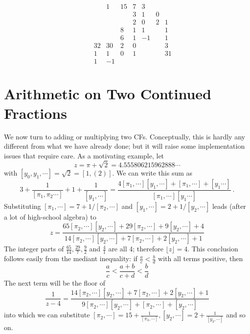 \documentclass[11pt, oneside]{amsart}   	%
\renewcommand{\:}{\negthickspace:\negthickspace}
\begin{document}
\begin{equation*}\label{eq:2dgrid}
\begin{matrix}
 & & & 1& 15&       7&  3& &\\
 & & &  &        &     3&   1& 0&\\
 & & &  &        &     2&    0& 2& 1\\
 & & &  &        8&   1&    1&   &  1\\
 & & &  &        6&   1&    -1&  & 1\\
 & & 32& 30&  2& 0&        &  &  3\\
 & &  1&   1&  0&  1&        &  & 31\\
 & &   1&  -1&   &    &        &  &
\end{matrix}
\end{equation*}


\section{Arithmetic on Two Continued Fractions}
We now turn to adding or multiplying two CFs. Conceptually, this is hardly any different from what we have already done;
but it will raise some implementation issues that require care. As a motivating example, let
\[
z = \pi + \sqrt{2} = 4.555806215962888\cdots
\]
 with $[y_0, y_1,\cdots] = \sqrt{2} = [1,(2)]$. We can write this sum as
\begin{equation*}
3 + \frac{1}{[\pi_1,\pi_2\cdots]} + 1 + \frac{1}{[y_1,\cdots]} = \frac{ 4[\pi_1,\cdots][y_1,\cdots] + [\pi_1,\cdots]  + [y_1\cdots]}{ [\pi_1,\cdots][y_1\cdots] }\ .
\end{equation*}
Substituting $[\pi_1,\cdots] = 7 + 1/[\pi_2,\cdots]$ and $[y_1,\cdots] = 2 + 1/[y_2,\cdots]$ leads (after a lot of high-school algebra) to 
\begin{equation*}
z = \frac{65[\pi_2,\cdots] [y_2,\cdots] + 29[\pi_2,\cdots] +9[y_2,\cdots] +4}{14[\pi_2,\cdots] [y_2,\cdots] + 7[\pi_2,\cdots] +2[y_2,\cdots] +1}
\end{equation*}
The integer parts of $\frac{65}{14}, \frac{29}{7}, \frac{9}{2}$ and  $\frac{4}{1}$ are all 4; therefore $\lfloor z \rfloor =4$.
This conclusion follows easily from the mediant inequality: if $\frac{a}{c} < \frac{b}{d}$ with all terms positive, then
\[
\frac{a}{c} < \frac{a+b}{c+d}< \frac{b}{d}
\] 
The next term will be the floor of
\begin{equation*}
\frac{1}{z-4} =  \frac{14[\pi_2,\cdots] [y_2,\cdots] + 7[\pi_2,\cdots] +2[y_2,\cdots] +1}{9[\pi_2,\cdots] [y_2,\cdots] + [\pi_2,\cdots] +[y_2,\cdots]}
\end{equation*}
into which we can substitute  $[\pi_2,\cdots]=15+\frac{1}{[\pi_3,\cdots]},  [y_2,\cdots]=2+\frac{1}{[y_3,\cdots]}$ and so on.
\end{document}
